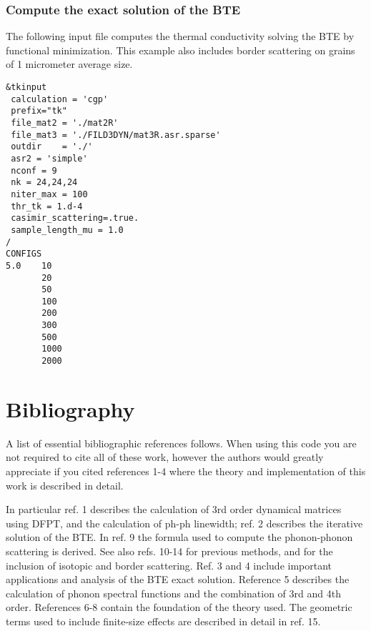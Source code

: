 \documentclass[
]{article}
\begin{document}
\hypertarget{compute-the-exact-solution-of-the-bte}{%
\subsubsection{Compute the exact solution of the
BTE}\label{compute-the-exact-solution-of-the-bte}}

The following input file computes the thermal conductivity solving the
BTE by functional minimization. This example also includes border
scattering on grains of 1 micrometer average size.

\begin{verbatim}
&tkinput 
 calculation = 'cgp' 
 prefix="tk"
 file_mat2 = './mat2R' 
 file_mat3 = './FILD3DYN/mat3R.asr.sparse' 
 outdir    = './' 
 asr2 = 'simple' 
 nconf = 9
 nk = 24,24,24
 niter_max = 100
 thr_tk = 1.d-4
 casimir_scattering=.true. 
 sample_length_mu = 1.0 
/ 
CONFIGS 
5.0    10 
       20 
       50 
       100 
       200 
       300 
       500 
       1000 
       2000
\end{verbatim}

\hypertarget{bibliography}{%
\section{Bibliography}\label{bibliography}}

A list of essential bibliographic references follows. When using this
code you are not required to cite all of these work, however the authors
would greatly appreciate if you cited references 1-4 where the theory
and implementation of this work is described in detail.

In particular ref. 1 describes the calculation of 3rd order dynamical
matrices using DFPT, and the calculation of ph-ph linewidth; ref. 2
describes the iterative solution of the BTE. In ref. 9 the formula used
to compute the phonon-phonon scattering is derived. See also refs. 10-14
for previous methods, and for the inclusion of isotopic and border
scattering. Ref. 3 and 4 include important applications and analysis of
the BTE exact solution. Reference 5 describes the calculation of phonon
spectral functions and the combination of 3rd and 4th order. References
6-8 contain the foundation of the theory used. The geometric terms used
to include finite-size effects are described in detail in ref. 15.
\end{document}
